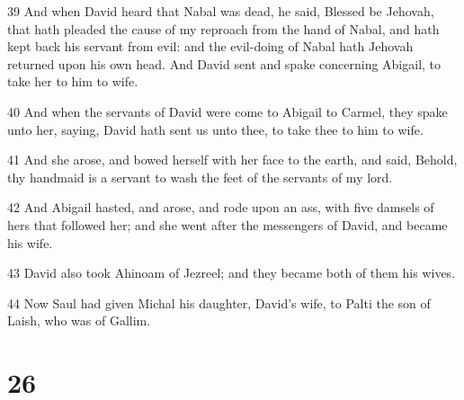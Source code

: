 \par 39 And when David heard that Nabal was dead, he said, Blessed be Jehovah, that hath pleaded the cause of my reproach from the hand of Nabal, and hath kept back his servant from evil: and the evil-doing of Nabal hath Jehovah returned upon his own head. And David sent and spake concerning Abigail, to take her to him to wife.
\par 40 And when the servants of David were come to Abigail to Carmel, they spake unto her, saying, David hath sent us unto thee, to take thee to him to wife.
\par 41 And she arose, and bowed herself with her face to the earth, and said, Behold, thy handmaid is a servant to wash the feet of the servants of my lord.
\par 42 And Abigail hasted, and arose, and rode upon an ass, with five damsels of hers that followed her; and she went after the messengers of David, and became his wife.
\par 43 David also took Ahinoam of Jezreel; and they became both of them his wives.
\par 44 Now Saul had given Michal his daughter, David's wife, to Palti the son of Laish, who was of Gallim.

\chapter{26}

